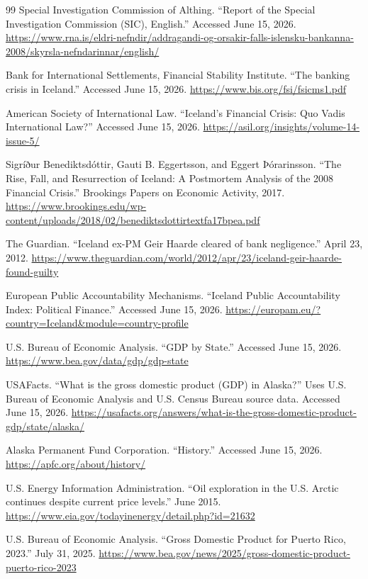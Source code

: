 \documentclass[11pt,a4paper]{article}
\begin{document}
\begin{thebibliography}{99}
Special Investigation Commission of Althing. ``Report of the Special Investigation Commission (SIC), English.'' Accessed June 15, 2026.
\url{https://www.rna.is/eldri-nefndir/addragandi-og-orsakir-falls-islensku-bankanna-2008/skyrsla-nefndarinnar/english/}

Bank for International Settlements, Financial Stability Institute. ``The banking crisis in Iceland.'' Accessed June 15, 2026.
\url{https://www.bis.org/fsi/fsicms1.pdf}

American Society of International Law. ``Iceland's Financial Crisis: Quo Vadis International Law?'' Accessed June 15, 2026.
\url{https://asil.org/insights/volume-14-issue-5/}

Sigríður Benediktsdóttir, Gauti B. Eggertsson, and Eggert Þórarinsson. ``The Rise, Fall, and Resurrection of Iceland: A Postmortem Analysis of the 2008 Financial Crisis.'' Brookings Papers on Economic Activity, 2017.
\url{https://www.brookings.edu/wp-content/uploads/2018/02/benediktsdottirtextfa17bpea.pdf}

The Guardian. ``Iceland ex-PM Geir Haarde cleared of bank negligence.'' April 23, 2012.
\url{https://www.theguardian.com/world/2012/apr/23/iceland-geir-haarde-found-guilty}

European Public Accountability Mechanisms. ``Iceland Public Accountability Index: Political Finance.'' Accessed June 15, 2026.
\url{https://europam.eu/?country=Iceland&module=country-profile}

U.S. Bureau of Economic Analysis. ``GDP by State.'' Accessed June 15, 2026.
\url{https://www.bea.gov/data/gdp/gdp-state}

USAFacts. ``What is the gross domestic product (GDP) in Alaska?'' Uses U.S. Bureau of Economic Analysis and U.S. Census Bureau source data. Accessed June 15, 2026.
\url{https://usafacts.org/answers/what-is-the-gross-domestic-product-gdp/state/alaska/}

Alaska Permanent Fund Corporation. ``History.'' Accessed June 15, 2026.
\url{https://apfc.org/about/history/}

U.S. Energy Information Administration. ``Oil exploration in the U.S. Arctic continues despite current price levels.'' June 2015.
\url{https://www.eia.gov/todayinenergy/detail.php?id=21632}

U.S. Bureau of Economic Analysis. ``Gross Domestic Product for Puerto Rico, 2023.'' July 31, 2025.
\url{https://www.bea.gov/news/2025/gross-domestic-product-puerto-rico-2023}


\end{thebibliography}
\end{document}
